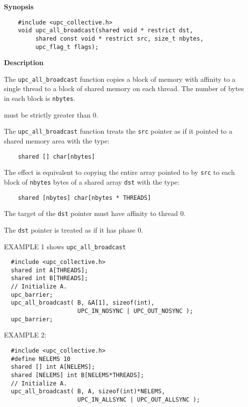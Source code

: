 {\bf Synopsis} 

\npf\vspace{-2.5em}
\begin{verbatim}
    #include <upc_collective.h>
    void upc_all_broadcast(shared void * restrict dst, 
         shared const void * restrict src, size_t nbytes, 
         upc_flag_t flags);
\end{verbatim}

{\bf Description} 

\np The {\tt upc\_all\_broadcast} function copies a block of memory with
affinity to a single thread to a block of shared memory on each thread.
The number of bytes in each block is {\tt nbytes}.

 must be strictly greater than 0.

\np The {\tt upc\_all\_broadcast} function treats the {\tt src} pointer
as if it pointed to a shared memory area with the type:

\begin{verbatim}
    shared [] char[nbytes]
\end{verbatim}  

\np The effect is equivalent to copying the entire array pointed to by
{\tt src} to each block of {\tt nbytes} bytes of a shared
array {\tt dst} with the type:

\begin{verbatim}
    shared [nbytes] char[nbytes * THREADS]
\end{verbatim}  

\np The target of the {\tt dst} pointer must have affinity to
thread 0.

\np The {\tt dst} pointer is treated as if it has phase 0.


\np EXAMPLE 1 shows {\tt upc\_all\_broadcast}
\begin{verbatim}
  #include <upc_collective.h>
  shared int A[THREADS];
  shared int B[THREADS];
  // Initialize A.
  upc_barrier;
  upc_all_broadcast( B, &A[1], sizeof(int),
                     UPC_IN_NOSYNC | UPC_OUT_NOSYNC );
  upc_barrier;
\end{verbatim}

\np EXAMPLE 2:
\begin{verbatim}
  #include <upc_collective.h>
  #define NELEMS 10
  shared [] int A[NELEMS];
  shared [NELEMS] int B[NELEMS*THREADS];
  // Initialize A.
  upc_all_broadcast( B, A, sizeof(int)*NELEMS,
                     UPC_IN_ALLSYNC | UPC_OUT_ALLSYNC );
\end{verbatim}

